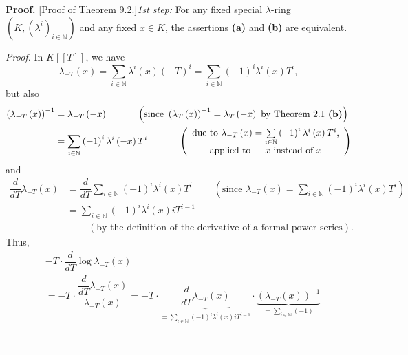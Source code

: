 \documentclass[numbers=enddot,12pt,final,onecolumn,notitlepage]{scrartcl}%
\newenvironment{proof}[1][Proof]{\noindent\textbf{#1.} }{\ \rule{0.5em}{0.5em}}
\begin{document}
\begin{proof}
[Proof of Theorem 9.2.]\textit{1st step:} For any fixed special $\lambda$-ring
$\left(  K,\left(  \lambda^{i}\right)  _{i\in\mathbb{N}}\right)  $ and any
fixed $x\in K$, the assertions \textbf{(a)} and \textbf{(b)} are equivalent.

\textit{Proof.} In $K\left[  \left[  T\right]  \right]  $, we have%
\[
\lambda_{-T}\left(  x\right)  =\sum_{i\in\mathbb{N}}\lambda^{i}\left(
x\right)  \left(  -T\right)  ^{i}=\sum_{i\in\mathbb{N}}\left(  -1\right)
^{i}\lambda^{i}\left(  x\right)  T^{i},
\]
but also%
\begin{align*}
\left(  \lambda_{-T}\left(  x\right)  \right)  ^{-1}  &  =\lambda_{-T}\left(
-x\right)  \ \ \ \ \ \ \ \ \ \ \left(  \text{since }\left(  \lambda_{T}\left(
x\right)  \right)  ^{-1}=\lambda_{T}\left(  -x\right)  \text{ by Theorem 2.1
\textbf{(b)}}\right) \\
&  =\sum_{i\in\mathbb{N}}\left(  -1\right)  ^{i}\lambda^{i}\left(  -x\right)
T^{i}\ \ \ \ \ \ \ \ \ \ \left(
\begin{array}
[c]{c}%
\text{due to }\lambda_{-T}\left(  x\right)  =\sum\limits_{i\in\mathbb{N}%
}\left(  -1\right)  ^{i}\lambda^{i}\left(  x\right)  T^{i}\text{,}\\
\text{applied to }-x\text{ instead of }x
\end{array}
\right)
\end{align*}
and%
\begin{align*}
\dfrac{d}{dT}\lambda_{-T}\left(  x\right)   &  =\dfrac{d}{dT}\sum
_{i\in\mathbb{N}}\left(  -1\right)  ^{i}\lambda^{i}\left(  x\right)
T^{i}\ \ \ \ \ \ \ \ \ \ \left(  \text{since }\lambda_{-T}\left(  x\right)
=\sum_{i\in\mathbb{N}}\left(  -1\right)  ^{i}\lambda^{i}\left(  x\right)
T^{i}\right) \\
&  =\sum_{i\in\mathbb{N}}\left(  -1\right)  ^{i}\lambda^{i}\left(  x\right)
iT^{i-1}\\
&  \ \ \ \ \ \ \ \ \ \ \left(  \text{by the definition of the derivative of a
formal power series}\right)  .
\end{align*}
Thus,%
\begin{align*}
&  -T\cdot\dfrac{d}{dT}\log\lambda_{-T}\left(  x\right) \\
&  =-T\cdot\dfrac{\dfrac{d}{dT}\lambda_{-T}\left(  x\right)  }{\lambda
_{-T}\left(  x\right)  }=-T\cdot\underbrace{\dfrac{d}{dT}\lambda_{-T}\left(
x\right)  }_{=\sum\limits_{i\in\mathbb{N}}\left(  -1\right)  ^{i}\lambda
^{i}\left(  x\right)  iT^{i-1}}\cdot\underbrace{\left(  \lambda_{-T}\left(
x\right)  \right)  ^{-1}}_{=\sum\limits_{i\in\mathbb{N}}\left(  -1\right)
}
\end{align*}
\end{proof}
\end{document}
